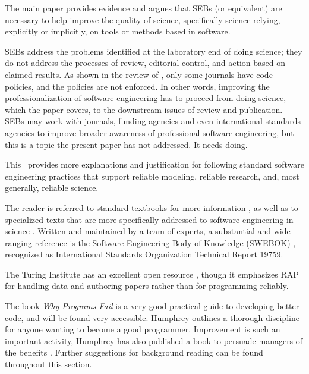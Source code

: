 \documentclass[10pt,a4paper]{article}
\begin{document}
The main paper provides evidence and argues that SEBs (or equivalent) are necessary to help improve the quality of science, specifically science relying, explicitly or implicitly, on tools or methods based in software. 

SEBs address the problems identified at the laboratory end of doing science; they do not address the processes of review, editorial control, and action based on claimed results. As shown in the review of , only some journals have code policies, and the policies are not enforced. In other words, improving the professionalization of software engineering has to proceed from doing science, which the paper covers, to the downstream issues of review and publication. SEBs may work with journals, funding agencies and even international standards agencies to improve broader awareness of professional software engineering, but this is a topic the present paper has not addressed. It needs doing.

\label{supplementary-best-practice}

This \supplement\ provides more explanations and justification for following standard software engineering practices that support reliable modeling, reliable research, and, most generally, reliable science. 

The reader is referred to standard textbooks for more information , as well as to specialized texts that are more specifically addressed to software engineering in science . Written and maintained by a team of experts, a substantial and wide-ranging reference is the Software Engineering Body of Knowledge (SWEBOK) \cite{swebok}, recognized as International Standards Organization Technical Report 19759.

The Turing Institute has an excellent open resource \cite{turing-way}, though it emphasizes RAP for handling data and authoring papers rather than for programming reliably.

The book \emph{Why Programs Fail\/} \cite{wpf} is a very good practical guide to developing better code, and will be found very accessible. Humphrey \cite{humphrey} outlines a thorough discipline for anyone wanting to become a good programmer. Improvement is such an important activity, Humphrey has also published a book to persuade managers of the benefits \cite{managers}. Further suggestions for background reading can be found throughout this section.
\end{document}

